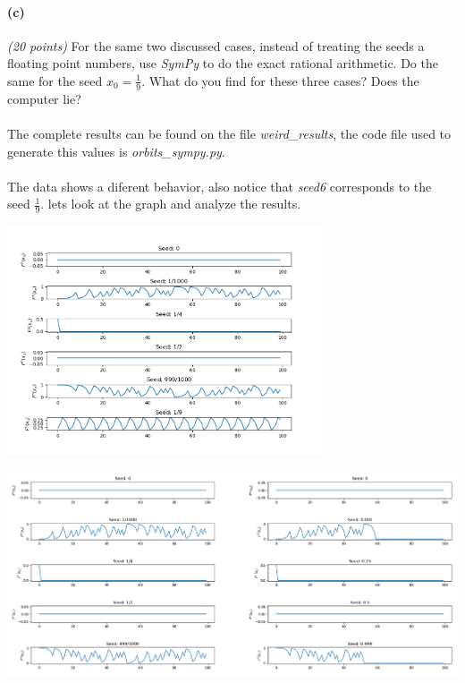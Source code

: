 \documentclass{article}
\begin{document}
\paragraph{(c)}\textit{(20 points)} For the same two discussed cases, instead of treating the seeds a floating point numbers, use \textit{SymPy} to do the exact rational arithmetic. Do the same for the seed $x_0=\frac{1}{9}$. What do you find for these three cases? Does the computer lie?
\begin{center}
\end{center}
\paragraph{} The complete results can be found on the file \textit{weird\_results}, the code file used to generate this values is \textit{orbits\_sympy.py}.
\paragraph{} The data shows a diferent behavior, also notice that \textit{seed6} corresponds to the seed $\frac{1}{9}$. lets look at the graph and analyze the results.
\begin{center}
	\includegraphics[width=0.7\textwidth]{plots_weird.png}
\end{center}
\begin{center}
	\includegraphics[width=\textwidth]{vs.png}
\end{center}
\end{document}
